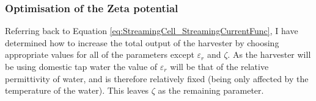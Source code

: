 \subsubsection*{Optimisation of the Zeta potential}

Referring back to Equation \ref{eq:StreamingCell_StreamingCurrentFunc}, I have
determined how to increase the total output of the harvester by choosing
appropriate values for all of the parameters except $\varepsilon_{r}$ and
$\zeta$. As the harvester will be using domestic tap water the value of
$\varepsilon_{r}$ will be that of the relative permittivity of water, and is
therefore relatively fixed (being only affected by the temperature of the
water). This leaves $\zeta$ as the remaining parameter.

